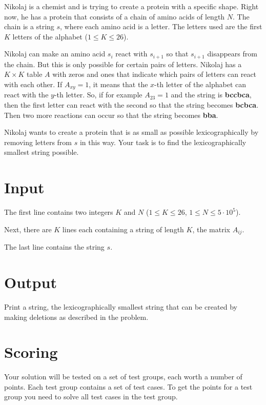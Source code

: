 \noindent
Nikolaj is a chemist and is trying to create a protein with a specific shape. Right now, he has a protein that consists of a chain of amino acids of length $N$. The chain is a string $s$, where each amino acid is a letter. The letters used are the first $K$ letters of the alphabet ($1 \leq K \leq 26$).

Nikolaj can make an amino acid $s_i$ react with $s_{i+1}$ so that $s_{i+1}$ disappears from the chain. But this is only possible for certain pairs of letters. Nikolaj has a $K \times K$ table $A$ with zeros and ones that indicate which pairs of letters can react with each other. If $A_{xy} = 1$, it means that the $x$-th letter of the alphabet can react with the $y$-th letter. So, if for example $A_{23} = 1$ and the string is \textbf{bccbca}, then the first letter can react with the second so that the string becomes \textbf{bcbca}. Then two more reactions can occur so that the string becomes \textbf{bba}.

Nikolaj wants to create a protein that is as small as possible lexicographically by removing letters from $s$ in this way. Your task is to find the lexicographically smallest string possible.

\section*{Input}
The first line contains two integers $K$ and $N$ ($1 \leq K \leq 26$, $1 \leq N \leq 5 \cdot 10^5$).

Next, there are $K$ lines each containing a string of length $K$, the matrix $A_{ij}$.

The last line contains the string $s$.

\section*{Output}
Print a string, the lexicographically smallest string that can be created by making deletions as described in the problem.

\section*{Scoring}
Your solution will be tested on a set of test groups, each worth a number of points. Each test group contains
a set of test cases. To get the points for a test group you need to solve all test cases in the test group.

